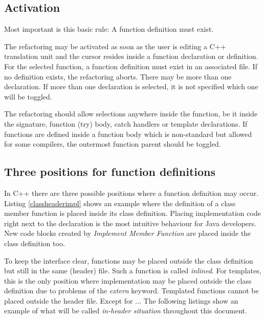 \subsection{Activation}

Most important is this basic rule: A function definition must exist.

The refactoring may be activated as soon as the user is editing a C++ 
translation unit and the cursor resides inside a function declaration or 
definition. For the selected function, a function definition must exist in an 
associated file. If no definition exists, the refactoring aborts. There may be 
more than one declaration. If more than one declaration is selected, it is not 
specified which one will be toggled.

The refactoring should allow selections anywhere inside the function, be it 
inside the signature, function (try) body, catch handlers or template 
declarations. If functions are defined inside a function body which is 
non-standard but allowed for some compilers, the outermost function parent 
should be toggled.

\subsection{Three positions for function definitions}

\label{positions}
In C++ there are three possible positions where a 
function definition may occur. Listing \ref{classheaderimpl} shows an example
where the definition of a class member function is placed inside its class
definition. Placing implementation code right next to the declaration is the
most intuitive behaviour for Java developers. New code blocks created by
\textit{Implement Member Function} are placed inside the class definition too.



To keep the interface clear,  functions may be 
placed outside the class definition but still in the same (header) file. Such a 
function is called \textit{inlined}. For templates, this is the only position 
where implementation may be placed outside the class definition due to problems 
of the \textit{extern} keyword. Templated functions cannot be placed outside the 
header file. Except for ... %
The following listings show an example of what will be called 
\textit{in-header situation} throughout this document.

